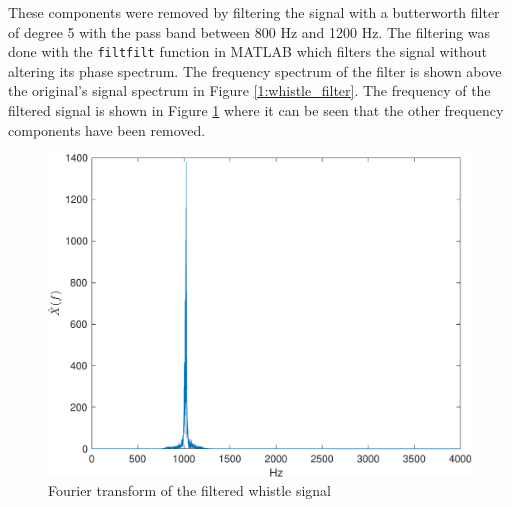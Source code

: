 \documentclass{IEEEtran}
\newcommand{\code}[1]{\texttt{#1}}
\begin{document}
These components were removed by filtering the signal with a butterworth
filter of degree 5 with the pass band between 800 Hz and 1200 Hz. The
filtering was done with the \code{filtfilt} function in MATLAB which filters
the signal without altering its phase spectrum. The frequency spectrum
of the filter is shown above the original's signal spectrum in Figure
\ref{1:whistle_filter}. The frequency of the filtered signal is shown
in Figure \ref{1:whistle_clean} where it can be seen that the other
frequency components have been removed.

\begin{figure}[h]
  \centering
  \captionsetup{justification=centering}

  \includegraphics[width=0.8\columnwidth]{pictures/whistle_clean.pdf}
  \caption{Fourier transform of the filtered whistle signal}
  \label{1:whistle_clean}

\end{figure}
\end{document}
